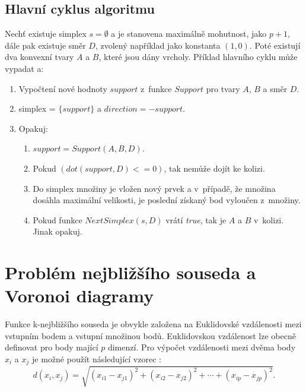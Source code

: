 \subsection*{Hlavní cyklus algoritmu}
Nechť existuje simplex $s = \emptyset$ a je stanovena maximálně mohutnost, jako $p+1$, dále pak existuje směr $D$, zvolený například jako konstanta $(1,0)$. Poté existují dva konvexní tvary $A$ a $B$, které jsou dány vrcholy. Příklad hlavního cyklu může vypadat a:
\begin{enumerate}
    \item Vypočtení nové hodnoty $support$ z~funkce $Support$ pro tvary $A$, $B$ a směr $D$.
    \item simplex = $\{support\}$ a $direction = -support$.
    \item Opakuj:
    \begin{enumerate}
    \item $support = Support(A,B,D)$.
    \item Pokud $(dot(support, D) <= 0)$, tak nemůže dojít ke kolizi.
    \item Do simplex množiny je vložen nový prvek a v~případě, že množina dosáhla maximální velikosti, je poslední získaný bod vyloučen z~množiny.
    \item Pokud funkce $NextSimplex(s, D)$ vrátí \emph{true}, tak je $A$ a $B$ v~kolizi. Jinak opakuj.    
    \end{enumerate}
\end{enumerate}










\section{Problém nejbližšího souseda a Voronoi diagramy}
\label{nn}

Funkce k-nejbližšího souseda je obvykle založena na Euklidovské vzdálenosti mezi vstupním bodem a vstupní množinou bodů. Euklidovskou vzdálenost lze obecně definovat pro body mající $p$ dimenzí. Pro výpočet vzdálenosti mezi dvěma body $x_i$ a $x_j$ je možné použít následující vzorec \cite{knn}:
\label{euklid}
\[
d(x_i, x_j) = \sqrt{(x_{i1} - x_{j1})^2 + (x_{i2} - x_{j2})^2 + \cdots + (x_{ip} - x_{jp})^2}.
\]


